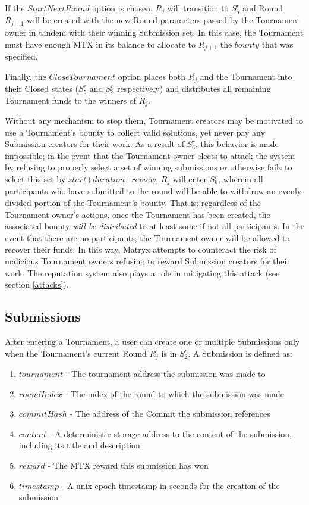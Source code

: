 \documentclass[a4paper, 10pt, conference]{ieeeconf}      %
\begin{document}
If the $StartNextRound$ option is chosen, $R_j$ will transition to $S_5^r$ and Round $R_{j+1}$ will be created with the new Round parameters passed by the Tournament owner in tandem with their winning Submission set. In this case, the Tournament must have enough MTX in its balance to allocate to $R_{j+1}$ the $bounty$ that was specified.

Finally, the $CloseTournament$ option places both $R_j$ and the Tournament into their Closed states ($S_{5}^r$ and $S_{3}^t$ respectively) and distributes all remaining Tournament funds to the winners of $R_j$.

Without any mechanism to stop them, Tournament creators may be motivated to use a Tournament's bounty to collect valid solutions, yet never pay any Submission creators for their work. As a result of $S_{6}^r$, this behavior is made impossible; in the event that the Tournament owner elects to attack the system by refusing to properly select a set of winning submissions or otherwise fails to select this set by $start$+$duration$+$review$, $R_j$ will enter $S_{6}^r$, wherein all participants who have submitted to the round will be able to withdraw an evenly-divided portion of the Tournament's bounty.
That is: regardless of the Tournament owner's actions, once the Tournament has been created, the associated bounty {\it will be distributed} to at least some if not all participants. In the event that there are no participants, the Tournament owner will be allowed to recover their funds.
In this way, Matryx attempts to counteract the risk of malicious Tournament owners refusing to reward Submission creators for their work. The reputation system also plays a role in mitigating this attack (see section \ref{attacks}).

\subsection{Submissions}\label{Submissions}

After entering a Tournament, a user can create one or multiple Submissions only when the Tournament's current Round $R_j$ is in $S_{2}^r$. A Submission is defined as:

\begin{enumerate}
\item $tournament$ - The tournament address the submission was made to
\item $roundIndex$ -  The index of the round to which the submission was made
\item $commitHash$ - The address of the Commit the submission references
\item $content$ - A deterministic storage address to the content of the submission, including its title and description
\item $reward$ - The MTX reward this submission has won
\item $timestamp$ - A unix-epoch timestamp in seconds for the creation of the submission
\end{enumerate}
\end{document}
